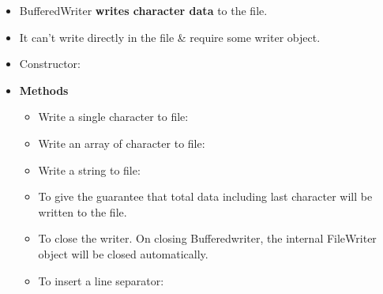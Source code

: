 \setlength{\columnsep}{3pt}
\begin{flushleft}
	
	\begin{itemize}
		\item BufferedWriter \textbf{writes character data} to the file.
		\item It can’t write directly in the file \& require some writer object.
		
		\item Constructor:
		\bigskip
		
		\item \textbf{Methods}
		\begin{itemize}
			\item Write a single character to file:
			\bigskip
			\item Write an array of character to file:
			\bigskip

			\item Write a string to file:
			\bigskip
			\item To give the guarantee that total data including last character will be written to the file.
			\bigskip
			
			\item To close the writer. On closing Bufferedwriter, the internal FileWriter object will be closed automatically.
			\bigskip
		
			\item To insert a line separator:
			\bigskip
		\end{itemize}
		
	\end{itemize}
	

\end{flushleft}
